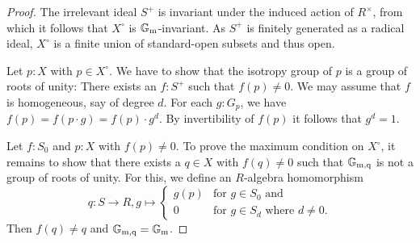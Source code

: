 \begin{proof}
  The irrelevant ideal $S^+$ is invariant under the induced action of
  $R^\times$, from which it follows that $X^\circ$ is $\Gm$-invariant.
  As $S^+$ is finitely generated as a radical ideal, $X^\circ$ is a
  finite union of standard-open subsets and thus open.

  Let $p\colon X$ with $p \in X^\circ$.  We have to show that the isotropy group of $p$
  is a group of roots of unity: There exists an $f\colon S^+$ such that
  $f(p) \neq 0$.  We may assume that $f$ is homogeneous, say of degree
  $d$.  For each $g\colon G_p$, we have
  $f(p) = f(p \cdot g) = f(p) \cdot g^d$.  By invertibility of $f(p)$
  it follows that $g^d = 1$.

  Let $f\colon S_0$ and $p\colon X$ with $f(p) \neq 0$.  To prove the
  maximum condition on $X^\circ$, it remains to show that there exists
  a $q \in X$ with $f(q) \neq 0$ such that $\Gm[,q]$ is not a group of roots of
  unity.  For this, we define an $R$-algebra homomorphism
  \begin{equation*}
    q\colon S \to R, g \mapsto
    \begin{cases}
      g(p) & \text{for $g \in S_0$ and} \\
      0 & \text{for $g \in S_d$ where $d \neq 0$.}
    \end{cases}
  \end{equation*}
  Then $f(q) \neq q$ and $\Gm[,q] = \Gm$.
\end{proof}

